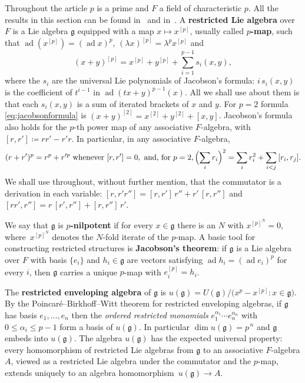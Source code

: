 \documentclass[11pt,reqno]{amsart}
\theoremstyle{plain}
\theoremstyle{remark}
\newcommand{\defn}{\textbf}
\newcommand{\ad}{\operatorname{ad}}
\begin{document}
Throughout the article $p$ is a prime and $F$ a field of characteristic $p$. 
All the results in this section can be found in~\cite{Jacobson} and in~\cite{SF}.
A \defn{restricted Lie algebra} over $F$ is a Lie algebra $\mathfrak{g}$ equipped with a
map $x\mapsto x^{[p]}$, usually called \defn{$p$-map}, such that
$\ad(x^{[p]})=(\ad x)^p$, $(\lambda x)^{[p]}=\lambda^p x^{[p]}$ and
\begin{equation}\label{eq:jacobsonformula}
(x+y)^{[p]}=x^{[p]}+y^{[p]}+\sum_{i=1}^{p-1}s_i(x,y),
\end{equation}
where the $s_i$ are the universal Lie polynomials of Jacobson's formula:
 $i\,s_i(x,y)$ is the coefficient of $t^{i-1}$ in $\ad(tx+y)^{p-1}(x)$. All we
shall use about them is that each $s_i(x,y)$ is a sum of iterated brackets of
$x$ and $y$. For $p=2$
formula \eqref{eq:jacobsonformula} is $(x+y)^{[2]}=x^{[2]}+y^{[2]}+[x,y]$.
Jacobson's formula also holds for the $p$-th power map of any associative
$F$-algebra, with $[r,r']\coloneqq rr'-r'r$. In particular, in any associative
$F$-algebra,
\begin{equation}\label{eq:square}
(r+r')^p=r^p+r'^p \text{ whenever } [r,r']=0,
\text{ and, for } p=2,
\Bigl(\sum_i r_i\Bigr)^{2}=\sum_i r_i^{2}+\sum_{i<j}\,[r_i,r_j].
\end{equation}
We shall use throughout, without further mention, that the commutator is a
derivation in each variable: $[r,r'r'']=[r,r']\,r''+r'\,[r,r'']$ and
$[rr',r'']=r\,[r',r'']+[r,r'']\,r'$.

We say that $\mathfrak{g}$ is \defn{$p$-nilpotent} if for every $x\in \mathfrak{g}$ there is an $N$
with $x^{[p]^N}=0$, where~$x^{[p]^N}$ denotes the $N$-fold iterate of the
$p$-map. A basic tool for constructing restricted structures is
\defn{Jacobson's theorem}: if $\mathfrak{g}$ is a Lie algebra over $F$ with basis $\{e_i\}$
and $h_i\in \mathfrak{g}$ are vectors satisfying $\ad h_i=(\ad e_i)^p$ for every $i$,
then $\mathfrak{g}$ carries a unique $p$-map with $e_i^{[p]}=h_i$.

The \defn{restricted enveloping algebra} of $\mathfrak{g}$ is
$u(\mathfrak{g})=U(\mathfrak{g})/\bigl(x^p-x^{[p]}:x\in \mathfrak{g}\bigr)$. By the
Poincar\'e--Birkhoff--Witt theorem for restricted enveloping algebras, if $\mathfrak{g}$ has basis
$e_1,\dots,e_n$ then the \emph{ordered restricted monomials}
$e_1^{\alpha_1}\cdots e_n^{\alpha_n}$ with $0\le\alpha_i\le p-1$ form a basis
of $u(\mathfrak{g})$. In particular $\dim u(\mathfrak{g})=p^{\,n}$ and $\mathfrak{g}$ embeds into $u(\mathfrak{g})$. The
algebra $u(\mathfrak{g})$ has the expected universal property: every homomorphism of
restricted Lie algebras from $\mathfrak{g}$ to an associative $F$-algebra $A$, viewed as
a restricted Lie algebra under the commutator and the $p$-map,
extends uniquely to an algebra homomorphism~$u(\mathfrak{g})\to A$.
\end{document}
